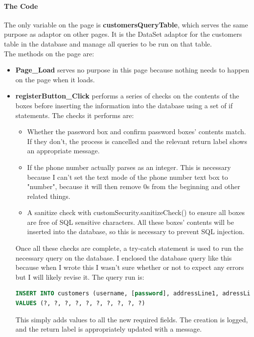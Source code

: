 ﻿\documentclass{article}
\begin{document}
    \paragraph{The Code}
    The only variable on the page is \textbf{customersQueryTable}, which serves the same purpose as adaptor on other pages.
    It is the DataSet adaptor for the customers table in the database and manage all queries to be run on that table.
    \\
    The methods on the page are:
    \begin{itemize}
        \item \textbf{Page\_Load} serves no purpose in this page because nothing needs to happen on the page when it loads.
        \item \textbf{registerButton\_Click} performs a series of checks on the contents of the boxes before inserting the information into the database using a set of if statements.
        The checks it performs are:
        \begin{itemize}
            \item Whether the password box and confirm password boxes' contents match.
            If they don't, the process is cancelled and the relevant return label shows an appropriate message.
            \item If the phone number actually parses as an integer.
            This is necessary because I can't set the text mode of the phone number text box to "number", because it will then remove 0s from the beginning and other related things.
            \item A sanitize check with customSecurity.sanitizeCheck() to ensure all boxes are free of SQL sensitive characters.
            All these boxes' contents will be inserted into the database, so this is necessary to prevent SQL injection.
        \end{itemize}
        Once all these checks are complete, a try-catch statement is used to run the necessary query on the database.
        I enclosed the database query like this because when I wrote this I wasn't sure whether or not to expect any errors but I will likely revise it.
        The query run is:
        \begin{lstlisting}[language=SQL]
INSERT INTO customers (username, [password], addressLine1, adressLine2, city, country, postCode, phoneNumber, forename, surname)
VALUES (?, ?, ?, ?, ?, ?, ?, ?, ?, ?)
        \end{lstlisting}
        This simply adds values to all the new required fields.
        The creation is logged, and the return label is appropriately updated with a message.
    \end{itemize}
\end{document}

